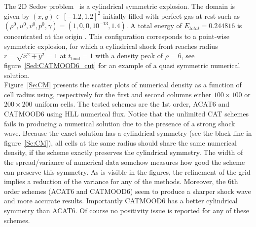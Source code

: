 The 2D Sedov problem~\cite{Sedov} is a cylindrical symmetric explosion. The domain is given by $(x,y) \in [-1.2,1.2]^2 $ initially filled with perfect gas at rest such as $(\rho^0, u^0, v^0, p^0, \gamma) = (1, 0, 0, 10^{-13}, 1.4)$. 
A total energy of $E_{total}=0.244816$ is concentrated at the origin \cite{LOUBERE2005105}. 
This configuration corresponds to a point-wise symmetric explosion, for which a cylindrical shock front reaches radius $r=\sqrt{x^2+y^2}=1$ at $t_\text{final}=1$ with a density peak of $\rho=6$, see figure~\ref{Sed:CATMOOD6_cut} for an example of a quasi symmetric numerical solution. \\
Figure~\ref{Se:CM} presents the scatter plots of numerical density as a function of cell radius using, respectively for the first and second columns either $100\times100$ or $200\times200$ uniform cells. The tested schemes are  
the 1st order, ACAT6 and CATMOOD6 using HLL numerical flux. 
Notice that the unlimited CAT schemes fails in producing a numerical solution due to the presence of a strong shock wave.
% 
Because the exact solution has a cylindrical symmetry (see the black line in figure~\ref{Se:CM}), all cells at the same radius should share the same numerical density, if the scheme exactly preserves the cylindrical symmetry.
The width of the spread/variance of numerical data somehow measures how good the scheme can preserve this symmetry.
As is visible in the figures, the refinement of the grid implies a reduction of the variance for any of the methods.
Moreover, the $6$th order schemes (ACAT6 and CATMOOD6) seem to produce a sharper shock wave and more accurate results. 
Importantly CATMOOD6 has a better cylindrical symmetry than ACAT6.
Of course no positivity issue is reported for any of these schemes.
